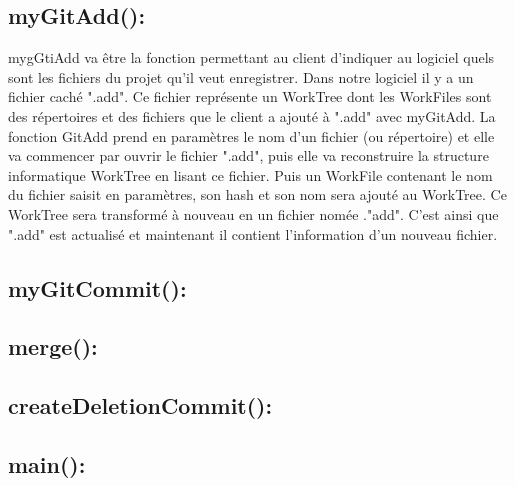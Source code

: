 \documentclass[12pt,francais]{article}
\begin{document}
\subsection{myGitAdd():}
	mygGtiAdd va être la fonction permettant au client d'indiquer au logiciel quels sont les fichiers du projet qu'il veut enregistrer. Dans notre logiciel il y a un fichier caché ".add". Ce fichier représente un WorkTree dont les WorkFiles sont des répertoires et des fichiers que le client a ajouté à ".add" avec myGitAdd.
		La fonction GitAdd prend en paramètres le nom d'un fichier (ou répertoire)  et elle va commencer par ouvrir le fichier ".add", puis elle va reconstruire la structure informatique WorkTree en lisant ce fichier. Puis un WorkFile contenant le nom du fichier saisit en paramètres, son hash et son nom sera ajouté au WorkTree. Ce WorkTree sera transformé à nouveau en un fichier nomée ."add". C'est ainsi que ".add" est actualisé et maintenant il contient l'information d'un nouveau fichier.
\subsection{myGitCommit():}
	
\subsection{merge():}
\subsection{createDeletionCommit():}
\subsection{main():}
\end{document}
